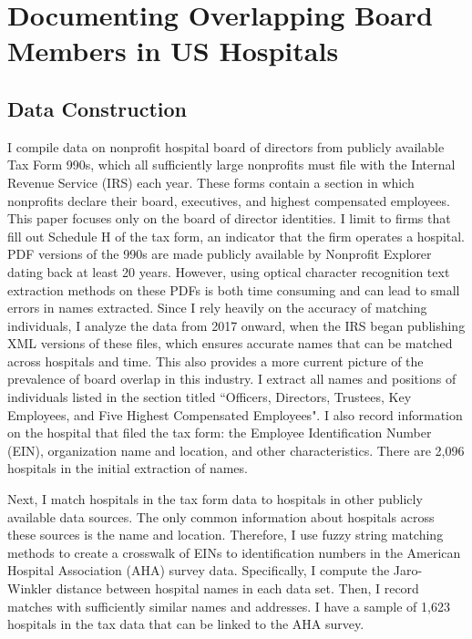 \documentclass[12pt]{article}
\begin{document}
    

    

    

    \section{Documenting Overlapping Board Members in US Hospitals}\label{sec:data}

    \subsection{Data Construction}

    
   I compile data on nonprofit hospital board of directors from publicly available Tax Form 990s, which all sufficiently large nonprofits must file with the Internal Revenue Service (IRS) each year. These forms contain a section in which nonprofits declare their board, executives, and highest compensated employees. This paper focuses only on the board of director identities. I limit to firms that fill out Schedule H of the tax form, an indicator that the firm operates a hospital. PDF versions of the 990s are made publicly available by Nonprofit Explorer dating back at least 20 years. However, using optical character recognition text extraction methods on these PDFs is both time consuming and can lead to small errors in names extracted. Since I rely heavily on the accuracy of matching individuals, I analyze the data from 2017 onward, when the IRS began publishing XML versions of these files, which ensures accurate names that can be matched across hospitals and time. This also provides a more current picture of the prevalence of board overlap in this industry. I extract all names and positions of individuals listed in the section titled ``Officers, Directors, Trustees, Key Employees, and Five Highest Compensated Employees". I also record information on the hospital that filed the tax form: the Employee Identification Number (EIN), organization name and location, and other characteristics. There are 2,096 hospitals in the initial extraction of names.

   Next, I match hospitals in the tax form data to hospitals in other publicly available data sources. The only common information about hospitals across these sources is the name and location. Therefore, I use fuzzy string matching methods to create a crosswalk of EINs to identification numbers in the American Hospital Association (AHA) survey data. Specifically, I compute the Jaro-Winkler distance between hospital names in each data set. Then, I record matches with sufficiently similar names and addresses. I have a sample of 1,623 hospitals in the tax data that can be linked to the AHA survey. 
\end{document}
